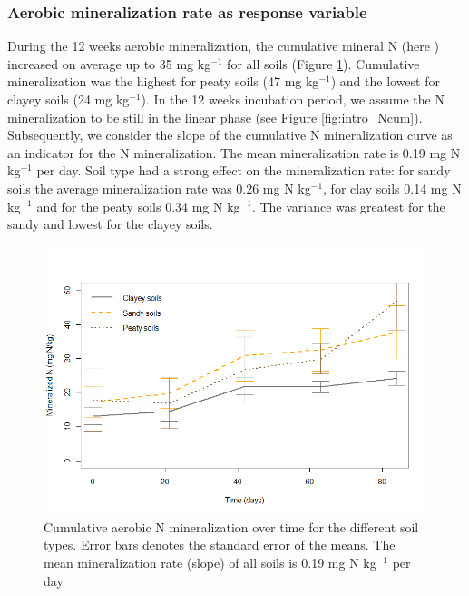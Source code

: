 \documentclass[10pt,twoside,dutch,english]{report}
\begin{document}
 \subsubsection{Aerobic mineralization rate as response variable} 
During the 12 weeks aerobic mineralization, the cumulative mineral N (here ) increased on average up to 35 mg kg$^{-1}$ for all soils (Figure \ref{fig:results_Ncum}). Cumulative mineralization was the highest for peaty soils (47 mg kg$^{-1}$) and the lowest for clayey soils (24 mg kg$^{-1}$).  In the 12 weeks incubation period, we assume the N mineralization to be still in the linear phase (see Figure \ref{fig:intro_Ncum}). Subsequently, we consider the slope of the cumulative N mineralization curve as an indicator for the N mineralization. The mean mineralization rate  is 0.19 mg N kg$^{-1}$ per day. Soil type had a strong effect on the mineralization rate: for sandy soils the average mineralization rate was 0.26 mg N kg$^{-1}$, for clay soils 0.14 mg N kg$^{-1}$  and for the peaty soils 0.34 mg N kg$^{-1}$. The variance was greatest for the sandy and lowest for the clayey soils. 
	\begin{figure}[h] %
	\centering
	\includegraphics[width=0.8\linewidth]{results_Ncum}
	\caption{Cumulative aerobic N mineralization over time for the different soil types. Error bars denotes the standard error of the means. The mean mineralization rate (slope) of all soils is 0.19 mg N kg$^{-1}$ per day}
	\label{fig:results_Ncum}
\end{figure}
\end{document}
